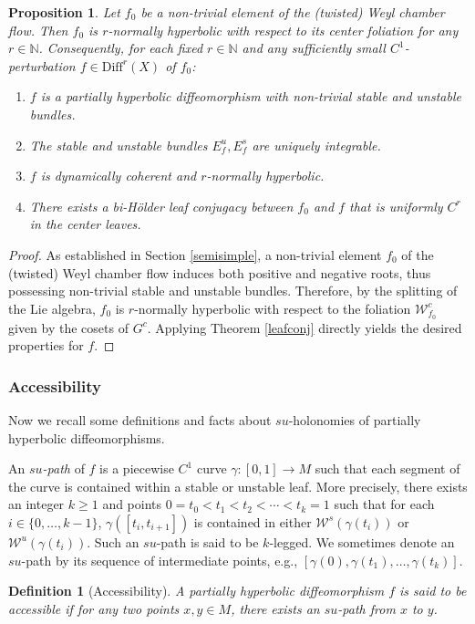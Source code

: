 \documentclass[11pt]{amsart}
\numberwithin{equation}{section}
\newcommand{\N}{\mathbb{N}}
\theoremstyle{plain}
\newtheorem{prop}[thm]{Proposition}
\newtheorem{defi}{Definition}[section]
\begin{document}
\begin{prop}\label{fparhyp}
Let $f_0$ be a non-trivial element of the (twisted) Weyl chamber flow. Then $f_0$ is $r$-normally hyperbolic with respect to its center foliation for any $r\in \N$. Consequently, for each fixed $r\in \N$ and any sufficiently small $C^1$-perturbation $f \in \mathrm{Diff}^r(X)$ of $f_0$:
\begin{enumerate}
    \item $f$ is a partially hyperbolic diffeomorphism with non-trivial stable and unstable bundles.
    \item The stable and unstable bundles $E^u_f,E^s_f$ are uniquely integrable.
    \item $f$ is dynamically coherent and $r$-normally hyperbolic.
    \item There exists a bi-H\"older leaf conjugacy between $f_0$ and $f$ that is uniformly $C^r$ in the center leaves.
\end{enumerate}
\end{prop}
\begin{proof}
As established in Section \ref{semisimple}, a non-trivial element $f_0$ of the (twisted) Weyl chamber flow induces both positive and negative roots, thus possessing non-trivial stable and unstable bundles. Therefore, by the splitting of the Lie algebra, $f_0$ is $r$-normally hyperbolic with respect to the foliation $\mathcal{W}^c_{f_0}$ given by the cosets of $G^c$. Applying Theorem \ref{leafconj} directly yields the desired properties for $f$.
\end{proof}
\subsubsection{Accessibility}
Now we recall some definitions and facts about $su$-holonomies of partially hyperbolic diffeomorphisms.

An \emph{$su$-path} of $f$ is a piecewise $C^1$ curve $\gamma:[0,1]\to M$ such that each segment of the curve is contained within a stable or unstable leaf. More precisely, there exists an integer $k \ge 1$ and points $0=t_0<t_1<t_2<\cdots<t_k=1$ such that for each $i \in \{0, \dots, k-1\}$, $\gamma([t_i,t_{i+1}])$ is contained in either $\mathcal{W}^s(\gamma(t_i))$ or $\mathcal{W}^u(\gamma(t_i))$. Such an $su$-path is said to be $k$-legged. We sometimes denote an $su$-path by its sequence of intermediate points, e.g., $[\gamma(0),\gamma(t_1),\dots,\gamma(t_k)]$.

\begin{defi}[Accessibility]
A partially hyperbolic diffeomorphism $f$ is said to be \emph{accessible} if for any two points $x,y\in M$, there exists an $su$-path from $x$ to $y$.
\end{defi}
\end{document}
